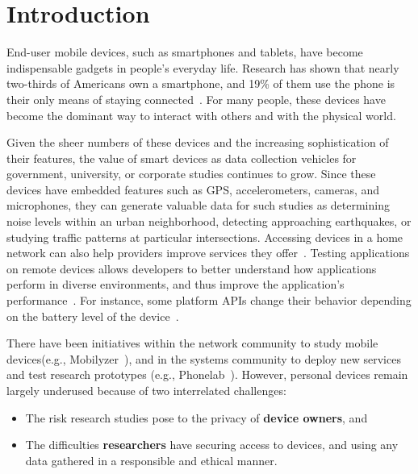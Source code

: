 \section{Introduction}

End-user mobile devices, such as smartphones and tablets, have become
indispensable gadgets in people's everyday life. %
Research has shown that nearly two-thirds of
Americans own a smartphone, and 19\% of them
use the phone is their only means of staying connected~\cite{phone2015}. 
For many people, these devices have become the dominant way to
interact with others and with the physical world.

Given the sheer numbers of these devices and the increasing
sophistication of their features,
the value of smart devices as data collection vehicles for government,
university, or corporate studies continues to grow. Since
these devices have embedded features such as GPS,
accelerometers, cameras, and microphones, they can generate valuable
data for such studies as determining noise levels within an urban
neighborhood, detecting approaching earthquakes, or studying traffic
patterns at particular intersections. Accessing devices in a home
network can also help providers improve services they 
offer~\cite{sundaresan2011broadband}. Testing applications on remote
devices allows developers to better understand how applications 
perform in diverse environments, and thus improve the application's 
performance~\cite{ravindranath2012appinsight}. For instance, 
some platform APIs change their behavior depending 
on the battery level of the device~\cite{battery}. 

There have been initiatives within the network
community to study mobile devices(e.g.,
Mobilyzer~\cite{nikravesh2015mobilyzer}), and in the systems community
to deploy new services and test research prototypes (e.g.,
Phonelab~\cite{phonelab, nandugudi2013phonelab}). However, personal devices
remain largely underused because of two interrelated challenges:

\begin{itemize}
\item The risk research studies pose to the privacy of \textbf{device 
owners}, and

\item The difficulties \textbf{researchers} have
securing access to devices, and using any data gathered in a
responsible and ethical manner. 
\end{itemize}
					
